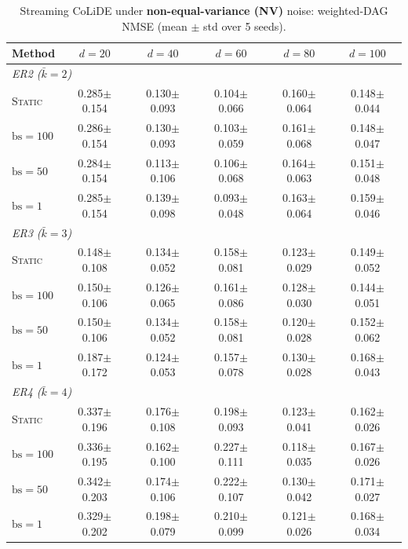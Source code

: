 \begin{table}[t]
\centering
\caption{Streaming CoLiDE under \textbf{non-equal-variance (NV)} noise:
weighted-DAG NMSE (mean $\pm$ std over 5 seeds).}
\label{tab:sem-nv-nmse}
\setlength{\tabcolsep}{6pt}
\begin{tabular}{l ccccc}
\toprule
\textbf{Method} & $d{=}20$ & $d{=}40$ & $d{=}60$ & $d{=}80$ & $d{=}100$ \\
\midrule
\multicolumn{6}{l}{\textit{ER2  ($\bar{k} = 2$)}} \\
\midrule
\textsc{Static} & 0.285$\pm$0.154 & 0.130$\pm$0.093 & 0.104$\pm$0.066 & 0.160$\pm$0.064 & 0.148$\pm$0.044 \\
$\mathrm{bs}{=}100$ & 0.286$\pm$0.154 & 0.130$\pm$0.093 & 0.103$\pm$0.059 & 0.161$\pm$0.068 & 0.148$\pm$0.047 \\
$\mathrm{bs}{=}50$  & 0.284$\pm$0.154 & 0.113$\pm$0.106 & 0.106$\pm$0.068 & 0.164$\pm$0.063 & 0.151$\pm$0.048 \\
$\mathrm{bs}{=}1$   & 0.285$\pm$0.154 & 0.139$\pm$0.098 & 0.093$\pm$0.048 & 0.163$\pm$0.064 & 0.159$\pm$0.046 \\
\midrule
\multicolumn{6}{l}{\textit{ER3  ($\bar{k} = 3$)}} \\
\midrule
\textsc{Static} & 0.148$\pm$0.108 & 0.134$\pm$0.052 & 0.158$\pm$0.081 & 0.123$\pm$0.029 & 0.149$\pm$0.052 \\
$\mathrm{bs}{=}100$ & 0.150$\pm$0.106 & 0.126$\pm$0.065 & 0.161$\pm$0.086 & 0.128$\pm$0.030 & 0.144$\pm$0.051 \\
$\mathrm{bs}{=}50$  & 0.150$\pm$0.106 & 0.134$\pm$0.052 & 0.158$\pm$0.081 & 0.120$\pm$0.028 & 0.152$\pm$0.062 \\
$\mathrm{bs}{=}1$   & 0.187$\pm$0.172 & 0.124$\pm$0.053 & 0.157$\pm$0.078 & 0.130$\pm$0.028 & 0.168$\pm$0.043 \\
\midrule
\multicolumn{6}{l}{\textit{ER4  ($\bar{k} = 4$)}} \\
\midrule
\textsc{Static} & 0.337$\pm$0.196 & 0.176$\pm$0.108 & 0.198$\pm$0.093 & 0.123$\pm$0.041 & 0.162$\pm$0.026 \\
$\mathrm{bs}{=}100$ & 0.336$\pm$0.195 & 0.162$\pm$0.100 & 0.227$\pm$0.111 & 0.118$\pm$0.035 & 0.167$\pm$0.026 \\
$\mathrm{bs}{=}50$  & 0.342$\pm$0.203 & 0.174$\pm$0.106 & 0.222$\pm$0.107 & 0.130$\pm$0.042 & 0.171$\pm$0.027 \\
$\mathrm{bs}{=}1$   & 0.329$\pm$0.202 & 0.198$\pm$0.079 & 0.210$\pm$0.099 & 0.121$\pm$0.026 & 0.168$\pm$0.034 \\
\bottomrule
\end{tabular}
\end{table}


